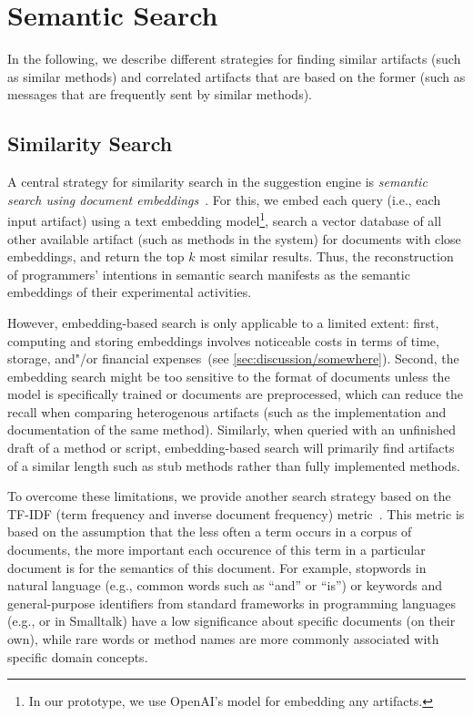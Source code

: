 
\section{Semantic Search}
\label{sec:suggestions/search}

In the following, we describe different strategies for finding similar artifacts (such as similar methods) and correlated artifacts that are based on the former (such as messages that are frequently sent by similar methods).

\subsection{Similarity Search}
\label{sec:suggestions/search/similar}

A central strategy for similarity search in the suggestion engine is \emph{semantic search using document embeddings}~\cite{lewis2020retrieval,mikolov2013efficient}.
For this, we embed each query (i.e., each input artifact) using a text embedding model\footnote{In our prototype, we use OpenAI's  model for embedding any artifacts.}, search a vector database of all other available artifact (such as methods in the system) for documents with close embeddings, and return the top $k$ most similar results.
Thus, the reconstruction of programmers' intentions in semantic search manifests as the semantic embeddings of their experimental activities.

However, embedding-based search is only applicable to a limited extent:
first, computing and storing embeddings involves noticeable costs in terms of time, storage, and"/or financial expenses~(see \cref{sec:discussion/somewhere}).
Second, the embedding search might be too sensitive to the format of documents unless the model is specifically trained or documents are preprocessed, which can reduce the recall when comparing heterogenous artifacts (such as the implementation and documentation of the same method).
Similarly, when queried with an unfinished draft of a method or script, embedding-based search will primarily find artifacts of a similar length such as stub methods rather than fully implemented methods.

To overcome these limitations, we provide another search strategy based on the TF-IDF (term frequency and inverse document frequency) metric~\cite{salton1988term}.
This metric is based on the assumption that the less often a term occurs in a corpus of documents, the more important each occurence of this term in a particular document is for the semantics of this document.
For example, stopwords in natural language (e.g., common words such as ``and'' or ``is'') or keywords and general-purpose identifiers from standard frameworks in programming languages (e.g.,  or  in Smalltalk) have a low significance about specific documents (on their own), while rare words or method names are more commonly associated with specific domain concepts.

